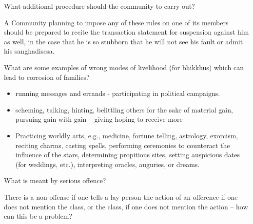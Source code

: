 \bigskip

What additional procedure should the community to carry out?

\begin{solution}
  A Community planning to impose any of these rules on one of its members should
  be prepared to recite the transaction statement for suspension against him as
  well, in the case that he is so stubborn that he will not see his fault or
  admit his sanghadisesa.
\end{solution}

\bigskip


What are some examples of wrong modes of livelihood (for bhikkhus) which can lead to corrosion of families?

\begin{solution}
  \begin{itemize}
  
  \item running messages and errands - participating in political campaigns.
  
  \item scheming, talking, hinting, belittling others for the sake of material
    gain, pursuing gain with gain – giving hoping to receive more
  
  \item Practicing worldly arts, e.g., medicine, fortune telling, astrology,
    exorcism, reciting charms, casting spells, performing ceremonies to counteract
    the influence of the stars, determining propitious sites, setting auspicious
    dates (for weddings, etc.), interpreting oracles, auguries, or dreams.
  
  \end{itemize}
\end{solution}

\bigskip


What is meant by serious offence?

\bigskip

There is a non-offense if one tells a lay person the action of an ofference if
one does not mention the class, or the class, if one does not mention the action
– how can this be a problem?

